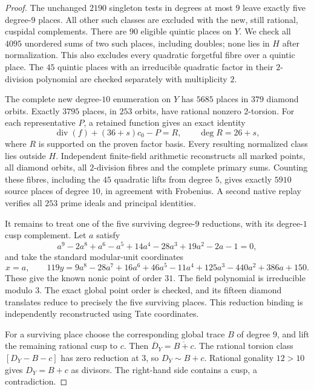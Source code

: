 \begin{proof}
The unchanged $2190$ singleton tests in degrees at most $9$ leave exactly
five degree-$9$ places. All other such classes are excluded with the new,
still rational, cuspidal complements.
There are $90$ eligible quintic places on $Y$.
We check all $4095$ unordered sums of two such places, including doubles;
none lies in $H$ after normalization.
This also excludes every quadratic forgetful fibre over a quintic place.
The $45$ quintic places with an irreducible quadratic factor in their
$2$-division polynomial are checked separately with multiplicity $2$.

The complete new degree-$10$ enumeration on $Y$ has $5685$ places in
$379$ diamond orbits.
Exactly $3795$ places, in $253$ orbits, have rational nonzero $2$-torsion.
For each representative $P$, a retained function gives an exact identity
\[
 \operatorname{div}(f)+(36+s)c_0-P=R,
 \qquad \deg R=26+s,
\]
where $R$ is supported on the proven factor basis.
Every resulting normalized class lies outside $H$.
Independent finite-field arithmetic reconstructs all marked points,
all diamond orbits, all $2$-division fibres and the complete primary sums.
Counting these fibres, including the $45$ quadratic lifts from degree $5$,
gives exactly $5910$ source places of degree $10$, in agreement with Frobenius.
A second native replay verifies all $253$ prime ideals and principal identities.

It remains to treat one of the five surviving degree-$9$ reductions,
with its degree-$1$ cusp complement.
Let $a$ satisfy
\[
 a^9-2a^8+a^6-a^5+14a^4-28a^3+19a^2-2a-1=0,
\]
and take the standard modular-unit coordinates
\[
 x=a,\qquad
 119y=9a^8-28a^7+16a^6+46a^5-11a^4
       +125a^3-440a^2+386a+150.
\]
These give the known nonic point of order $31$.
The field polynomial is irreducible modulo $3$.
The exact global point order is checked, and its fifteen diamond translates
reduce to precisely the five surviving places.
This reduction binding is independently reconstructed using Tate coordinates.

For a surviving place choose the corresponding global trace $B$ of degree $9$,
and lift the remaining rational cusp to $c$.
Then $\overline D_Y=\overline{B+c}$.
The rational torsion class $[D_Y-B-c]$ has zero reduction at $3$, so
$D_Y\sim B+c$.
Rational gonality $12>10$ gives $D_Y=B+c$ as divisors.
The right-hand side contains a cusp, a contradiction.
\end{proof}
